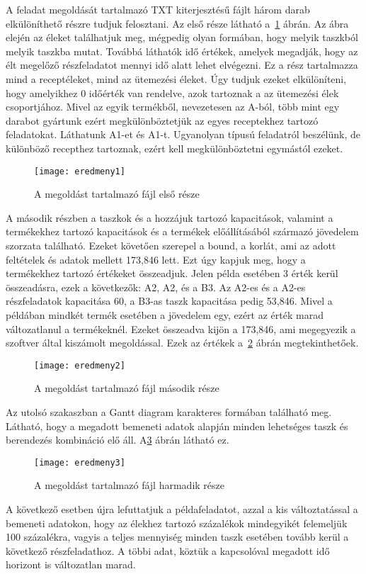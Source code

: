 A feladat megoldását tartalmazó TXT kiterjesztésű fájlt három darab elkülöníthető részre tudjuk felosztani. Az első része látható a~\ref{eredmeny1} ábrán. Az ábra elején az éleket találhatjuk meg, mégpedig olyan formában, hogy melyik taszkból melyik taszkba mutat. Továbbá láthatók idő értékek, amelyek megadják, hogy az élt megelőző részfeladatot mennyi idő alatt lehet elvégezni. Ez a rész tartalmazza mind a receptéleket, mind az ütemezési éleket. Úgy tudjuk ezeket elkülöníteni, hogy amelyikhez 0 időérték van rendelve, azok tartoznak a az ütemezési élek csoportjához. Mivel az egyik termékből, nevezetesen az A-ból, több mint egy darabot gyártunk ezért megkülönböztetjük az egyes receptekhez tartozó feladatokat. Láthatunk A1-et és A1-t. Ugyanolyan típusú feladatról beszélünk, de különböző recepthez tartoznak, ezért kell megkülönböztetni egymástól ezeket. 
\begin{figure}[H]
\begin{center}
\texttt{[image: eredmeny1]}
\caption{A megoldást tartalmazó fájl első része}
\label{eredmeny1}
\end{center}
\end{figure}
A második részben a taszkok és a hozzájuk tartozó kapacitások, valamint a termékekhez tartozó kapacitások és a termékek előállításából származó jövedelem szorzata található. Ezeket követően szerepel a bound, a korlát, ami az adott feltételek és adatok mellett 173,846 lett. Ezt úgy kapjuk meg, hogy a termékekhez tartozó értékeket összeadjuk. Jelen példa esetében 3 érték kerül összeadásra, ezek a következők: A2, A2, és a B3. Az A2-es és a A2-es részfeladatok kapacitása 60, a B3-as taszk kapacitása pedig 53,846. Mivel a példában mindkét termék esetében a jövedelem egy, ezért az érték marad változatlanul a termékeknél. Ezeket összeadva kijön a 173,846, ami megegyezik a szoftver által kiszámolt megoldással. Ezek az értékek a~\ref{eredmeny2} ábrán megtekinthetőek.
\begin{figure}[H]
\begin{center}
\texttt{[image: eredmeny2]}
\caption{A megoldást tartalmazó fájl második része}
\label{eredmeny2}
\end{center}
\end{figure}
Az utolsó szakaszban a Gantt diagram karakteres formában található meg. Látható, hogy a megadott bemeneti adatok alapján minden lehetséges taszk és berendezés kombináció elő áll. A\ref{eredmeny3} ábrán látható ez. 
\begin{figure}[H]
\begin{center}
\texttt{[image: eredmeny3]}
\caption{A megoldást tartalmazó fájl harmadik része}
\label{eredmeny3}
\end{center}
\end{figure}
A következő esetben újra lefuttatjuk a példafeladatot, azzal a kis változtatással a bemeneti adatokon, hogy az élekhez tartozó százalékok mindegyikét felemeljük 100 százalékra, vagyis a teljes mennyiség minden taszk esetében tovább kerül a következő részfeladathoz. A többi adat, köztük a kapcsolóval megadott idő horizont is változatlan marad. 

